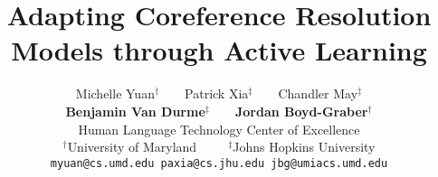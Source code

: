 \documentclass[11pt]{article}
\title{Adapting Coreference Resolution Models through Active Learning}
\author{Michelle Yuan$^\dagger$\ \ \ \ Patrick Xia$^\ddagger$\ \ \ \ Chandler May$^\ddagger$\\
{\bf Benjamin Van Durme}$^\ddagger$\ \ \ \ {\bf Jordan Boyd-Graber}$^\dagger$\\
    Human Language Technology Center of Excellence\\
    $^\dagger$University of Maryland\ \ \ \ \ $^\ddagger$Johns Hopkins University\\
    \texttt{myuan@cs.umd.edu paxia@cs.jhu.edu jbg@umiacs.umd.edu} \\}
\date{}
\newcommand{\latexfile}[1]{}
\begin{document}
\maketitle
\begin{abstract}
\latexfile{00-abstract}
\end{abstract}
\latexfile{10-intro}
\latexfile{20-coref}
\latexfile{30-active}
\latexfile{40-experiments}
\latexfile{50-related}
\latexfile{60-conclusion}
\latexfile{70-ethics}
\latexfile{acknowledgements.tex}



\latexfile{appendix}
\end{document}
